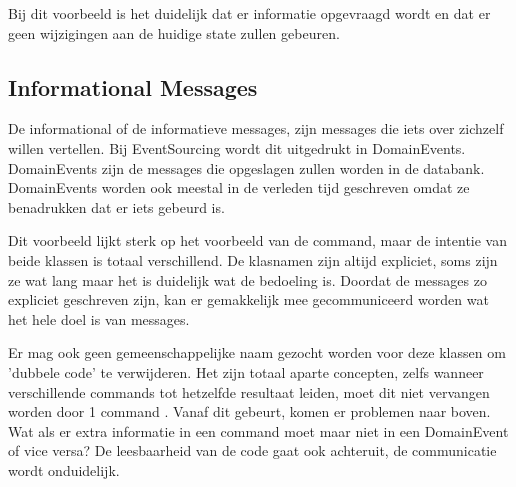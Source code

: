 
Bij dit voorbeeld is het duidelijk dat er informatie opgevraagd wordt en dat er geen wijzigingen aan de huidige state zullen gebeuren.

\subsection{Informational Messages}
\label{subsec:informational-messages}

De informational of de informatieve messages, zijn messages die iets over zichzelf willen vertellen. Bij EventSourcing wordt dit uitgedrukt in DomainEvents. DomainEvents zijn de messages die opgeslagen zullen worden in de databank. DomainEvents worden ook meestal in de verleden tijd geschreven omdat ze benadrukken dat er iets gebeurd is.


Dit voorbeeld lijkt sterk op het voorbeeld van de \Gls{command}, maar de intentie van beide klassen is totaal verschillend. De klasnamen zijn altijd expliciet, soms zijn ze wat lang maar het is duidelijk wat de bedoeling is. Doordat de messages zo expliciet geschreven zijn, kan er gemakkelijk mee gecommuniceerd worden wat het hele doel is van messages.

Er mag ook geen gemeenschappelijke naam gezocht worden voor deze klassen om 'dubbele code' te verwijderen. Het zijn totaal aparte concepten, zelfs wanneer verschillende \Glspl{command} tot hetzelfde resultaat leiden, moet dit niet vervangen worden door 1 \Gls{command} \autocite{Verraes2014DDDLinguistic}. Vanaf dit gebeurt, komen er problemen naar boven. Wat als er extra informatie in een \Gls{command} moet maar niet in een DomainEvent of vice versa? De leesbaarheid van de code gaat ook achteruit, de communicatie wordt onduidelijk.
